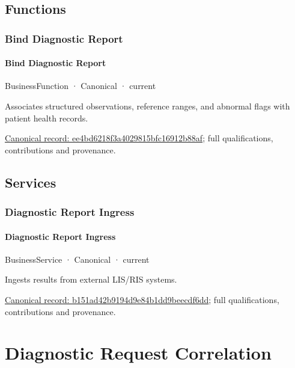 \subsection{Functions}

\subsubsection{Bind Diagnostic Report}

\paragraph{Bind Diagnostic Report}

\label{element:ee4bd6218f3a4029815bfc16912b88af}
{\small BusinessFunction · Canonical · current}\par

Associates structured observations, reference ranges, and abnormal flags with patient health records.


{\footnotesize \href{../../../../continuum/business/business-function/ee4bd6218f3a4029815bfc16912b88af.md}{Canonical record: ee4bd6218f3a4029815bfc16912b88af}; full qualifications, contributions and provenance.}\par
\subsection{Services}

\subsubsection{Diagnostic Report Ingress}

\paragraph{Diagnostic Report Ingress}

\label{element:b151ad42b9194d9e84b1dd9beecdf6dd}
{\small BusinessService · Canonical · current}\par

Ingests results from external LIS/RIS systems.


{\footnotesize \href{../../../../continuum/business/business-service/b151ad42b9194d9e84b1dd9beecdf6dd.md}{Canonical record: b151ad42b9194d9e84b1dd9beecdf6dd}; full qualifications, contributions and provenance.}\par
\section{Diagnostic Request Correlation}

